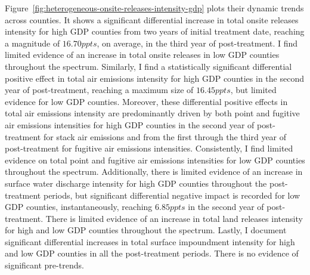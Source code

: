 \documentclass[12pt, english]{article}
\begin{document}
    Figure~\ref{fig:heterogeneous-onsite-releases-intensity-gdp} plots their dynamic trends across counties. It shows a significant differential increase in total onsite releases intensity for high GDP counties from two years of initial treatment date, reaching a magnitude of $16.70ppts$, on average, in the third year of post-treatment. I find limited evidence of an increase in total onsite releases in low GDP counties throughout the spectrum. Similarly, I find a statistically significant differential positive effect in total air emissions intensity for high GDP counties in the second year of post-treatment, reaching a maximum size of $16.45ppts$, but limited evidence for low GDP counties. Moreover, these differential positive effects in total air emissions intensity are predominantly driven by both point and fugitive air emissions intensities for high GDP counties in the second year of post-treatment for stack air emissions and from the first through the third year of post-treatment for fugitive air emissions intensities. Consistently, I find limited evidence on total point and fugitive air emissions intensities for low GDP counties throughout the spectrum. Additionally, there is limited evidence of an increase in surface water discharge intensity for high GDP counties throughout the post-treatment periods, but significant differential negative impact is recorded for low GDP counties, instantaneously, reaching $6.85ppts$ in the second year of post-treatment. There is limited evidence of an increase in total land releases intensity for high and low GDP counties throughout the spectrum. Lastly, I document significant differential increases in total surface impoundment intensity for high and low GDP counties in all the post-treatment periods. There is no evidence of significant pre-trends.
\end{document}
